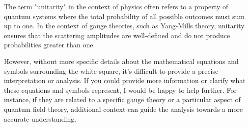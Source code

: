 The term "unitarity" in the context of physics often refers to a property of quantum systems where the total probability of all possible outcomes must sum up to one. In the context of gauge theories, such as Yang-Mills theory, unitarity ensures that the scattering amplitudes are well-defined and do not produce probabilities greater than one.

However, without more specific details about the mathematical equations and symbols surrounding the white square, it's difficult to provide a precise interpretation or analysis. If you could provide more information or clarify what these equations and symbols represent, I would be happy to help further. For instance, if they are related to a specific gauge theory or a particular aspect of quantum field theory, additional context can guide the analysis towards a more accurate understanding.